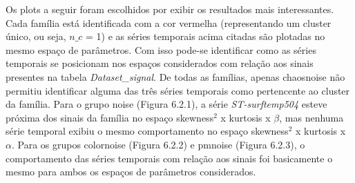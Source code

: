 Os plots a seguir foram escolhidos por exibir os resultados mais interessantes. Cada família está identificada com a cor vermelha (representando um cluster único, ou seja, $n\_c$ = 1) e as séries temporais acima citadas são plotadas no mesmo espaço de parâmetros. Com isso pode-se identificar como as séries temporais se posicionam nos espaços considerados com relação aos sinais presentes na tabela \textit{Dataset\_signal}. De todas as famílias, apenas chaosnoise não permitiu identificar alguma das três séries temporais como pertencente ao cluster da família. Para o grupo noise (Figura 6.2.1), a série \textit{ST-surftemp504} esteve próxima dos sinais da família no espaço skewness$^{2}$ x kurtosis x $\beta$, mas nenhuma série temporal exibiu o mesmo comportamento no espaço skewness$^{2}$ x kurtosis x $\alpha$. Para os grupos colornoise (Figura 6.2.2) e pmnoise (Figura 6.2.3), o comportamento das séries temporais com relação aos sinais foi basicamente o mesmo para ambos os espaços de parâmetros considerados.

\begin{figure}[ht!]
	\vspace{0mm}	%
	\begin{center}
	\end{center}
	\vspace{-2mm}	%
	\label{ex6_fig3}
\end{figure}

